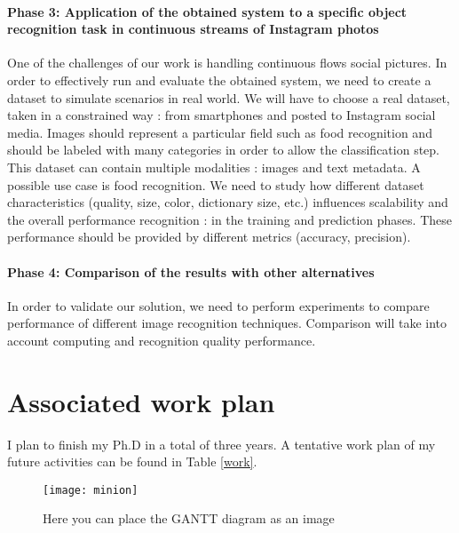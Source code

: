 \paragraph{Phase 3: Application of the obtained system to a specific object recognition task in continuous streams of Instagram photos}

One of the challenges of our work is handling continuous flows social pictures. In order to effectively run and evaluate the obtained system, we need to create a dataset to simulate scenarios in real world. We will have to choose a real dataset, taken in a constrained way : from smartphones and posted to Instagram social media. Images should represent a particular field such as food recognition and should be labeled with many categories in order to allow the classification step. This dataset can contain multiple modalities : images and text metadata. A possible use case is food recognition. We need to study how different dataset characteristics (quality, size, color, dictionary size, etc.) influences scalability and the overall performance recognition : in the training and prediction phases. These performance should be provided by different metrics (accuracy, precision).
\paragraph{Phase 4: Comparison of the results with other alternatives}
In order to validate our solution, we need to perform experiments to compare performance of different image recognition techniques. Comparison will take into account computing and recognition quality performance.


\section{Associated work plan}

I plan to finish my Ph.D in a total of three years. A tentative work plan of my future activities can be found in Table \ref{work}. 

\begin{landscape}

\begin{figure}[b] 
\centering    
\texttt{[image: minion]}
\caption[Minion]{Here you can place the GANTT diagram as an image}
\label{fig:minion}
\end{figure}

\end{landscape}


